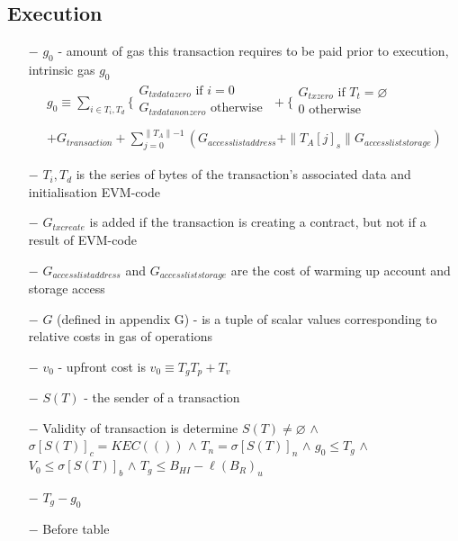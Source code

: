 \documentclass{article}
\begin{document}
\subsection{Execution}

\begin{itemize}
    \item[$-$] $g_0$ - amount of gas this transaction requires to be paid prior to execution, intrinsic gas $g_0$
    \begin{align*}     
        g_0 \equiv \sum_{i \in T_i, T_d} \biggl\{
            \begin{array}{ll}
                G_{txdatazero} \text{ if } i=0\\
                G_{txdatanonzero} \text{ otherwise }\\
            \end{array}
            + \biggl\{
                \begin{array}{ll}
                    G_{txzero} \text{ if } T_t = \varnothing \\
                    0 \text{ otherwise} \\
                \end{array} \\
            + G_{transaction} 
            + \sum_{j=0}^{\parallel T_A \parallel - 1} 
            (G_{accesslistaddress} 
            + \| T_A[j]_s \| G_{accessliststorage})
    \end{align*}
        \item[$-$] $T_i, T_d$ is the series of bytes of the transaction's associated data and initialisation EVM-code
        \item[$-$] $G_{txcreate}$ is added if the transaction is creating a contract, but not if a result of EVM-code 
        \item[$-$] $G_{accesslistaddress}$ and $G_{accessliststorage}$ are the cost of warming up account and storage access
        \item[$-$] $G$ (defined in appendix G) - is a tuple of scalar values corresponding to relative costs in gas of operations 
        \item[$-$] $v_0$ - upfront cost is $v_0 \equiv T_gT_p + T_v$
        \item[$-$] $S(T)$ - the sender of a transaction
        \item[$-$] Validity of transaction is determine $S(T) \neq \varnothing$ $\wedge$ $\sigma[S(T)]_c = KEC(())$ $\wedge$ $T_n = \sigma[S(T)]_n$ $\wedge$ $g_0 \leq T_g$ $\wedge$ $V_0 \leq \sigma[S(T)]_b$ $\wedge$ $T_g \leq B_{HI} - \ell(B_R)_u$
        \item[$-$] $T_g - g_0$
        \item[$-$] Before table 


\end{itemize}
\end{document}
